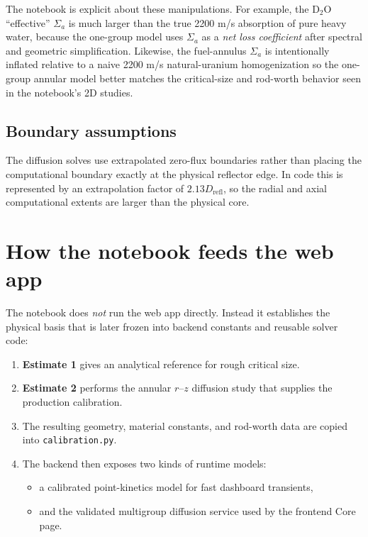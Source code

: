 \documentclass[11pt]{article}
\begin{document}
The notebook is explicit about these manipulations.  For example, the D$_2$O
``effective'' $\Sigma_a$ is much larger than the true 2200 m/s absorption of
pure heavy water, because the one-group model uses $\Sigma_a$ as a \emph{net
loss coefficient} after spectral and geometric simplification.  Likewise, the
fuel-annulus $\Sigma_a$ is intentionally inflated relative to a naive
2200 m/s natural-uranium homogenization so the one-group annular model better
matches the critical-size and rod-worth behavior seen in the notebook's 2D
studies.

\subsection{Boundary assumptions}

The diffusion solves use extrapolated zero-flux boundaries rather than placing
the computational boundary exactly at the physical reflector edge.  In code this
is represented by an extrapolation factor of $2.13 D_{\mathrm{refl}}$, so the
radial and axial computational extents are larger than the physical core.

\section{How the notebook feeds the web app}

The notebook does \emph{not} run the web app directly.  Instead it establishes
the physical basis that is later frozen into backend constants and reusable
solver code:

\begin{enumerate}
  \item \textbf{Estimate 1} gives an analytical reference for rough critical size.
  \item \textbf{Estimate 2} performs the annular $r$--$z$ diffusion study that
        supplies the production calibration.
  \item The resulting geometry, material constants, and rod-worth data are copied
        into \texttt{calibration.py}.
  \item The backend then exposes two kinds of runtime models:
        \begin{itemize}
          \item a calibrated point-kinetics model for fast dashboard transients,
          \item and the validated multigroup diffusion service used by the
                frontend Core page.
        \end{itemize}
\end{enumerate}
\end{document}
